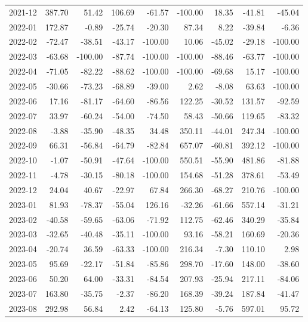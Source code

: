 \begin{table}[ht]
\begin{tabular}{lrrrrrrrr}
  2021-12 & 387.70 & 51.42 & 106.69 & -61.57 & -100.00 & 18.35 & -41.81 & -45.04 \\ 
  2022-01 & 172.87 & -0.89 & -25.74 & -20.30 & 87.34 & 8.22 & -39.84 & -6.36 \\ 
  2022-02 & -72.47 & -38.51 & -43.17 & -100.00 & 10.06 & -45.02 & -29.18 & -100.00 \\ 
  2022-03 & -63.68 & -100.00 & -87.74 & -100.00 & -100.00 & -88.46 & -63.77 & -100.00 \\ 
  2022-04 & -71.05 & -82.22 & -88.62 & -100.00 & -100.00 & -69.68 & 15.17 & -100.00 \\ 
  2022-05 & -30.66 & -73.23 & -68.89 & -39.00 & 2.62 & -8.08 & 63.63 & -100.00 \\ 
  2022-06 & 17.16 & -81.17 & -64.60 & -86.56 & 122.25 & -30.52 & 131.57 & -92.59 \\ 
  2022-07 & 33.97 & -60.24 & -54.00 & -74.50 & 58.43 & -50.66 & 119.65 & -83.32 \\ 
  2022-08 & -3.88 & -35.90 & -48.35 & 34.48 & 350.11 & -44.01 & 247.34 & -100.00 \\ 
  2022-09 & 66.31 & -56.84 & -64.79 & -82.84 & 657.07 & -60.81 & 392.12 & -100.00 \\ 
  2022-10 & -1.07 & -50.91 & -47.64 & -100.00 & 550.51 & -55.90 & 481.86 & -81.88 \\ 
  2022-11 & -4.78 & -30.15 & -80.18 & -100.00 & 154.68 & -51.28 & 378.61 & -53.49 \\ 
  2022-12 & 24.04 & 40.67 & -22.97 & 67.84 & 266.30 & -68.27 & 210.76 & -100.00 \\ 
  2023-01 & 81.93 & -78.37 & -55.04 & 126.16 & -32.26 & -61.66 & 557.14 & -31.21 \\ 
  2023-02 & -40.58 & -59.65 & -63.06 & -71.92 & 112.75 & -62.46 & 340.29 & -35.84 \\ 
  2023-03 & -32.65 & -40.48 & -35.11 & -100.00 & 93.16 & -58.21 & 160.69 & -20.36 \\ 
  2023-04 & -20.74 & 36.59 & -63.33 & -100.00 & 216.34 & -7.30 & 110.10 & 2.98 \\ 
  2023-05 & 95.69 & -22.17 & -51.84 & -85.86 & 298.70 & -17.60 & 148.00 & -38.60 \\ 
  2023-06 & 50.20 & 64.00 & -33.31 & -84.54 & 207.93 & -25.94 & 217.11 & -84.06 \\ 
  2023-07 & 163.80 & -35.75 & -2.37 & -86.20 & 168.39 & -39.24 & 187.84 & -41.47 \\ 
  2023-08 & 292.98 & 56.84 & 2.42 & -64.13 & 125.80 & -5.76 & 597.01 & 95.72 \\ 

\end{tabular}
\end{table}

